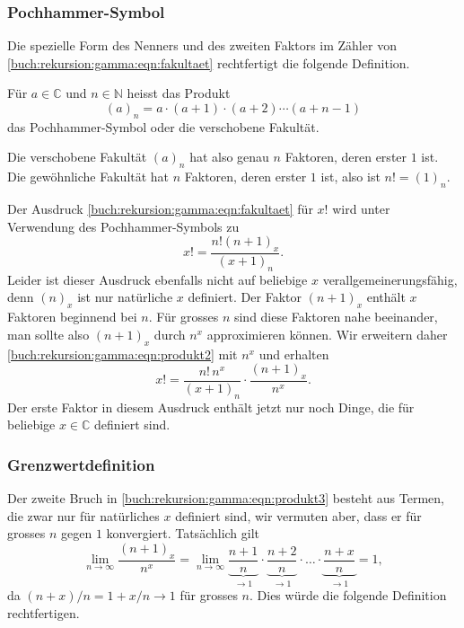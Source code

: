 \subsubsection{Pochhammer-Symbol}
Die spezielle Form des Nenners und des zweiten Faktors im Zähler
von \eqref{buch:rekursion:gamma:eqn:fakultaet}
rechtfertigt die folgende Definition.

\begin{definition}[Pochhammer]
Für $a\in\mathbb{C}$ und $n\in\mathbb{N}$ heisst das Produkt
\[
(a)_n = a\cdot(a+1)\cdot(a+2)\cdots(a+n-1)
\]
das Pochhammer-Symbol oder die verschobene Fakultät.
\end{definition}

Die verschobene Fakultät $(a)_n$ hat also genau $n$ Faktoren, deren
erster $1$ ist.
Die gewöhnliche Fakultät hat $n$ Faktoren, deren erster $1$ ist, also
ist $n! = (1)_n$.

Der Ausdruck \eqref{buch:rekursion:gamma:eqn:fakultaet}
für $x!$ wird unter Verwendung des Pochhammer-Symbols zu
\begin{equation}
x! = \frac{n! (n+1)_x}{(x+1)_n}.
\label{buch:rekursion:gamma:eqn:produkt2}
\end{equation}
Leider ist dieser Ausdruck ebenfalls nicht auf beliebige $x$
verallgemeinerungsfähig, denn $(n)_x$ ist nur natürliche $x$ definiert.
Der Faktor $(n+1)_x$ enthält $x$ Faktoren beginnend bei $n$.
Für grosses $n$ sind diese Faktoren nahe beeinander, man sollte also
$(n+1)_x$ durch $n^x$ approximieren können.
Wir erweitern daher \eqref{buch:rekursion:gamma:eqn:produkt2} mit $n^x$
und erhalten
\begin{equation}
x!
=
\frac{n!\,n^x}{(x+1)_n}\cdot
\frac{(n+1)_x}{n^x}.
\label{buch:rekursion:gamma:eqn:produkt3}
\end{equation}
Der erste Faktor in diesem Ausdruck enthält jetzt nur noch Dinge,
die für beliebige $x\in\mathbb{C}$ definiert sind.

\subsubsection{Grenzwertdefinition}
Der zweite Bruch in \eqref{buch:rekursion:gamma:eqn:produkt3}
besteht aus Termen, die zwar nur für natürliches $x$ definiert sind,
wir vermuten aber, dass er für grosses $n$ gegen $1$ konvergiert.
Tatsächlich gilt
\[
\lim_{n\to\infty}
\frac{(n+1)_x}{n^x}
=
\lim_{n\to\infty}
\underbrace{\frac{n+1}{n}}_{\displaystyle\to 1}
\cdot
\underbrace{\frac{n+2}{n}}_{\displaystyle\to 1}
\cdot\ldots\cdot
\underbrace{\frac{n+x}{n}}_{\displaystyle\to 1}
=
1,
\]
da  $(n+x)/n=1+x/n\to 1$ für grosses $n$.
Dies würde die folgende Definition rechtfertigen.

